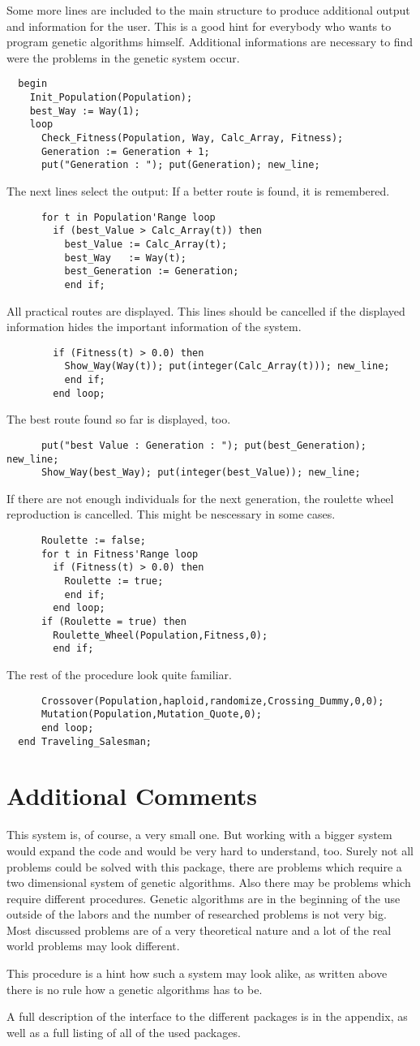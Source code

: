 Some more lines are included to the main structure to produce additional output
and information for the user. This is a good hint for everybody who wants to program
genetic algorithms himself. Additional informations are necessary to find were the
problems in the genetic system occur.
\begin{verbatim}
  begin
    Init_Population(Population);
    best_Way := Way(1);
    loop
      Check_Fitness(Population, Way, Calc_Array, Fitness);
      Generation := Generation + 1;
      put("Generation : "); put(Generation); new_line;
\end{verbatim}
The next lines select the output: If a better route is found, it is remembered.
\begin{verbatim}
      for t in Population'Range loop
        if (best_Value > Calc_Array(t)) then
          best_Value := Calc_Array(t);
          best_Way   := Way(t);
          best_Generation := Generation;
          end if;
\end{verbatim}
All practical routes are displayed. This lines should be cancelled if the displayed
information hides the important information of the system.
\begin{verbatim}
        if (Fitness(t) > 0.0) then
          Show_Way(Way(t)); put(integer(Calc_Array(t))); new_line;
          end if;
        end loop;
\end{verbatim}
The best route found so far is displayed, too.
\begin{verbatim}
      put("best Value : Generation : "); put(best_Generation); new_line;
      Show_Way(best_Way); put(integer(best_Value)); new_line;
\end{verbatim}
If there are not enough individuals for the next generation, the roulette wheel
reproduction is cancelled. This might be nescessary in some cases.
\begin{verbatim}
      Roulette := false;
      for t in Fitness'Range loop
        if (Fitness(t) > 0.0) then
          Roulette := true;
          end if;
        end loop;
      if (Roulette = true) then
        Roulette_Wheel(Population,Fitness,0);
        end if;
\end{verbatim}
The rest of the procedure look quite familiar.
\begin{verbatim}
      Crossover(Population,haploid,randomize,Crossing_Dummy,0,0);
      Mutation(Population,Mutation_Quote,0);
      end loop;
  end Traveling_Salesman;
\end{verbatim}
\section{Additional Comments}
This system is, of course, a very small one. But working with a bigger system
would expand the code and would be very hard to understand, too. Surely not all
problems could be solved with this package, there are problems which require
a two dimensional system of genetic algorithms. Also there may be problems which
require different procedures. Genetic algorithms are in the beginning of the
use outside of the labors and the number of researched problems is not very
big. Most discussed problems are of a very theoretical nature and a lot of the
real world problems may look different.

This procedure is a hint how such a system may look alike, as written above
there is no rule how a genetic algorithms has to be.

A full description of the interface to the different packages is in the appendix,
as well as a full listing of all of the used packages.